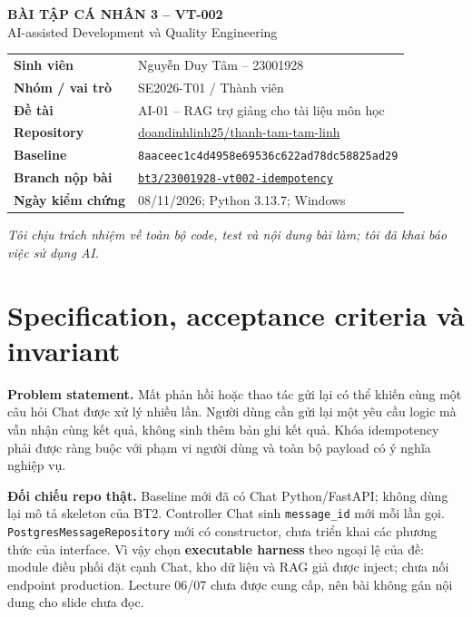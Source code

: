 \documentclass[11pt,a4paper]{article}
\DeclareRobustCommand{\code}[1]{\nolinkurl{#1}}
\newcommand{\Repo}{https://github.com/doandinhlinh25/thanh-tam-tam-linh}
\newcommand{\Branch}{bt3/23001928-vt002-idempotency}
\begin{document}
\small

\begin{center}
{\Large\bfseries BÀI TẬP CÁ NHÂN 3 -- VT-002}\\[3pt]
{\large AI-assisted Development và Quality Engineering}
\end{center}
\begin{tabular}{@{}L{33mm}L{\dimexpr\textwidth-33mm-2\tabcolsep\relax}@{}}
\textbf{Sinh viên} & Nguyễn Duy Tâm -- 23001928\\
\textbf{Nhóm / vai trò} & SE2026-T01 / Thành viên\\
\textbf{Đề tài} & AI-01 -- RAG trợ giảng cho tài liệu môn học\\
\textbf{Repository} & \href{\Repo}{doandinhlinh25/thanh-tam-tam-linh}\\
\textbf{Baseline} & \code{8aaceec1c4d4958e69536c622ad78dc58825ad29}\\
\textbf{Branch nộp bài} & \href{\Repo/tree/\Branch}{\code{bt3/23001928-vt002-idempotency}}\\
\textbf{Ngày kiểm chứng} & 08/11/2026; Python 3.13.7; Windows\\
\end{tabular}

\textit{Tôi chịu trách nhiệm về toàn bộ code, test và nội dung bài làm; tôi đã khai báo việc sử dụng AI.}

\section{Specification, acceptance criteria và invariant}
\textbf{Problem statement.} Mất phản hồi hoặc thao tác gửi lại có thể khiến cùng một câu hỏi Chat được xử lý nhiều lần. Người dùng cần gửi lại một yêu cầu logic mà vẫn nhận cùng kết quả, không sinh thêm bản ghi kết quả. Khóa idempotency phải được ràng buộc với phạm vi người dùng và toàn bộ payload có ý nghĩa nghiệp vụ.

\textbf{Đối chiếu repo thật.} Baseline mới đã có Chat Python/FastAPI; không dùng lại mô tả skeleton của BT2. Controller Chat sinh \code{message_id} mới mỗi lần gọi. \code{PostgresMessageRepository} mới có constructor, chưa triển khai các phương thức của interface. Vì vậy chọn \textbf{executable harness} theo ngoại lệ của đề: module điều phối đặt cạnh Chat, kho dữ liệu và RAG giả được inject; chưa nối endpoint production. Lecture 06/07 chưa được cung cấp, nên bài không gán nội dung cho slide chưa đọc.
\end{document}

